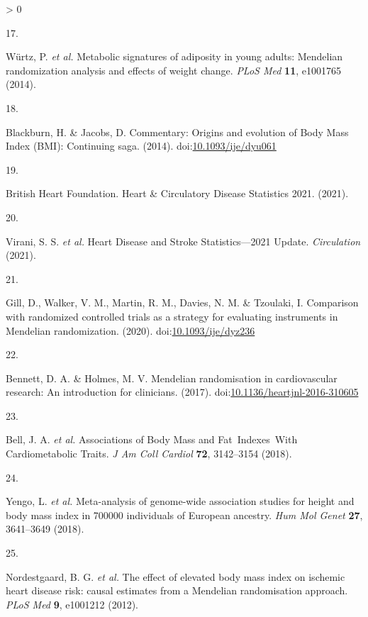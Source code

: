 \documentclass[11pt,twoside]{bristolthesis}
\newlength{\cslhangindent}
\newlength{\csllabelwidth}
\newenvironment{CSLReferences}[2] %
 {%
  \setlength{\parindent}{0pt}
  \ifodd #1 \everypar{\setlength{\hangindent}{\cslhangindent}}\ignorespaces\fi
  \ifnum #2 > 0
  \setlength{\parskip}{#2\baselineskip}
  \fi
 }%
 {}
\newcommand{\CSLLeftMargin}[1]{\parbox[t]{\csllabelwidth}{#1}}
\newcommand{\CSLRightInline}[1]{\parbox[t]{\linewidth - \csllabelwidth}{#1}\break}
\begin{document}
\begin{CSLReferences}{0}{0}
\leavevmode\hypertarget{ref-Wurtz2014}{}%
\CSLLeftMargin{17. }
\CSLRightInline{Würtz, P. \emph{et al.} {Metabolic signatures of adiposity in young adults: Mendelian randomization analysis and effects of weight change}. \emph{PLoS Med} \textbf{11}, e1001765 (2014).}

\leavevmode\hypertarget{ref-Blackburn2014}{}%
\CSLLeftMargin{18. }
\CSLRightInline{Blackburn, H. \& Jacobs, D. {Commentary: Origins and evolution of Body Mass Index (BMI): Continuing saga}. (2014). doi:\href{https://doi.org/10.1093/ije/dyu061}{10.1093/ije/dyu061}}

\leavevmode\hypertarget{ref-BritishHeartFoundation2021}{}%
\CSLLeftMargin{19. }
\CSLRightInline{British Heart Foundation. {Heart {\&} Circulatory Disease Statistics 2021}. (2021).}

\leavevmode\hypertarget{ref-Virani2021}{}%
\CSLLeftMargin{20. }
\CSLRightInline{Virani, S. S. \emph{et al.} {Heart Disease and Stroke Statistics---2021 Update}. \emph{Circulation} (2021).}

\leavevmode\hypertarget{ref-Gill2020}{}%
\CSLLeftMargin{21. }
\CSLRightInline{Gill, D., Walker, V. M., Martin, R. M., Davies, N. M. \& Tzoulaki, I. {Comparison with randomized controlled trials as a strategy for evaluating instruments in Mendelian randomization}. (2020). doi:\href{https://doi.org/10.1093/ije/dyz236}{10.1093/ije/dyz236}}

\leavevmode\hypertarget{ref-Bennett2017}{}%
\CSLLeftMargin{22. }
\CSLRightInline{Bennett, D. A. \& Holmes, M. V. {Mendelian randomisation in cardiovascular research: An introduction for clinicians}. (2017). doi:\href{https://doi.org/10.1136/heartjnl-2016-310605}{10.1136/heartjnl-2016-310605}}

\leavevmode\hypertarget{ref-Bell2018}{}%
\CSLLeftMargin{23. }
\CSLRightInline{Bell, J. A. \emph{et al.} {Associations of Body Mass and Fat~Indexes~With Cardiometabolic Traits}. \emph{J Am Coll Cardiol} \textbf{72}, 3142--3154 (2018).}

\leavevmode\hypertarget{ref-Yengo2018}{}%
\CSLLeftMargin{24. }
\CSLRightInline{Yengo, L. \emph{et al.} {Meta-analysis of genome-wide association studies for height and body mass index in 700000 individuals of European ancestry}. \emph{Hum Mol Genet} \textbf{27}, 3641--3649 (2018).}

\leavevmode\hypertarget{ref-Nordestgaard2012}{}%
\CSLLeftMargin{25. }
\CSLRightInline{Nordestgaard, B. G. \emph{et al.} {The effect of elevated body mass index on ischemic heart disease risk: causal estimates from a Mendelian randomisation approach}. \emph{PLoS Med} \textbf{9}, e1001212 (2012).}


\end{CSLReferences}
\end{document}
